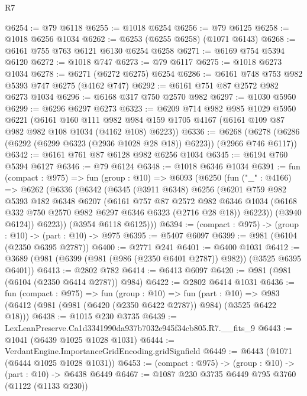\begin{lexlean}{R7}
\begin{coremodule}
@6254 := @79 @6118
@6255 := @1018 @6254
@6256 := @79 @6125
@6258 := @1018 @6256 @1034
@6262 := @6253 (@6255 @6258) (@1071 @6143)
@6268 := @6161 @755 @763 @6121 @6130 @6254 @6258
@6271 := @6169 @754 @5394 @6120
@6272 := @1018 @747
@6273 := @79 @6117
@6275 := @1018 @6273 @1034
@6278 := @6271 (@6272 @6275) @6254
@6286 := @6161 @748 @753 @982 @5393 @747 @6275 (@4162 @747)
@6292 := @6161 @751 @87 @2572 @982 @6273 @1034
@6296 := @6168 @317 @750 @2570 @982
@6297 := @1030 @5950
@6299 := @6296 @6297 @6273
@6323 := @6209
    @714
    @982
    @985
    @1029
    @5950
    @6221
    (@6161
      @160
      @111
      @982
      @984
      @159
      @1705
      @4167
      (@6161 @109 @87 @982 @982 @108 @1034 (@4162 @108) @6223))
@6336 := @6268 (@6278 (@6286 (@6292 (@6299 @6323 (@2936 @1028 @28 @18)) @6223)) (@2966 @746 @6117))
@6342 := @6161 @761 @87 @6128 @982 @6256 @1034
@6345 := @6194 @760 @5394 @6127
@6346 := @79 @6124
@6348 := @1018 @6346 @1034
@6391 := fun (compact : @975) =>
  fun (group : @10) =>
  @6093
    (@6250
      (fun ("_" : @4166) =>
      @6262
        (@6336
          (@6342
            (@6345
              (@3911 @6348)
              @6256
              (@6201
                @759
                @982
                @5393
                @182
                @6348
                @6207
                (@6161
                  @757
                  @87
                  @2572
                  @982
                  @6346
                  @1034
                  (@6168 @332 @750 @2570 @982 @6297 @6346 @6323 (@2716 @28 @18))
                  @6223))
              (@3940 @6124))
            @6223))
        (@3954 @6118 @6125)))
@6394 := (compact : @975) -> (group : @10) -> (part : @10) -> @975
@6395 := @5407 @6097
@6399 := @981 (@6104 (@2350 @6395 @2787))
@6400 := @2771 @241
@6401 := @6400 @1031
@6412 := @3689 (@981 (@6399 (@981 (@986 (@2350 @6401 @2787)) @982)) (@3525 @6395 @6401))
@6413 := @2802 @782
@6414 := @6413 @6097
@6420 := @981 (@981 (@6104 (@2350 @6414 @2787)) @984)
@6422 := @2802 @6414 @1031
@6436 := fun (compact : @975) =>
  fun (group : @10) =>
  fun (part : @10) => @983 (@6412 (@981 (@981 (@6420 (@2350 @6422 @2787)) @984) (@3525 @6422 @18)))
@6438 := @1015 @230 @3735
@6439 := LexLeanPreserve.Ca1d3341990da937b7032e945f34cb805.R7.__fits_9
@6443 := @1041 (@6439 @1025 @1028 @1031)
@6444 := VerdantEngine.ImportanceGridEncoding.gridSignfield
@6449 := @6443 (@1071 (@6444 @1025 @1028 @1031))
@6453 := (compact : @975) -> (group : @10) -> (part : @10) -> @6438 @6449
@6467 := @1087
    @230
    @3735
    @6449
    @795
    @3760
    (@1122 (@1133 @230))

\end{coremodule}
\end{lexlean}
